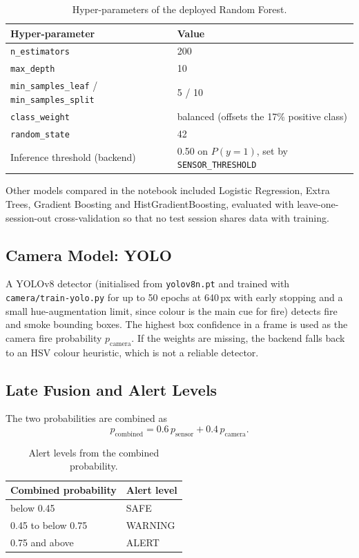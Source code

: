 \documentclass[12pt,a4paper]{article}
\begin{document}
\begin{table}[H]
\centering
\caption{Hyper-parameters of the deployed Random Forest.}
\label{tab:hyper}
\begin{tabular}{ll}
\toprule
\textbf{Hyper-parameter} & \textbf{Value} \\
\midrule
\texttt{n\_estimators}                         & 200 \\
\texttt{max\_depth}                            & 10 \\
\texttt{min\_samples\_leaf} / \texttt{min\_samples\_split} & 5 / 10 \\
\texttt{class\_weight}                         & balanced (offsets the 17\% positive class) \\
\texttt{random\_state}                         & 42 \\
Inference threshold (backend)                  & 0.50 on $P(y=1)$, set by \texttt{SENSOR\_THRESHOLD} \\
\bottomrule
\end{tabular}
\end{table}

Other models compared in the notebook included Logistic Regression, Extra Trees, Gradient Boosting and HistGradientBoosting, evaluated with leave-one-session-out cross-validation so that no test session shares data with training.

\subsection{Camera Model: YOLO}
A YOLOv8 detector (initialised from \texttt{yolov8n.pt} and trained with \texttt{camera/train-yolo.py} for up to 50 epochs at 640\,px with early stopping and a small hue-augmentation limit, since colour is the main cue for fire) detects fire and smoke bounding boxes. The highest box confidence in a frame is used as the camera fire probability $p_{\text{camera}}$. If the weights are missing, the backend falls back to an HSV colour heuristic, which is not a reliable detector.

\subsection{Late Fusion and Alert Levels}
The two probabilities are combined as
\begin{equation}
  p_{\text{combined}} = 0.6\,p_{\text{sensor}} + 0.4\,p_{\text{camera}}.
\end{equation}

\begin{table}[H]
\centering
\caption{Alert levels from the combined probability.}
\label{tab:alert}
\begin{tabular}{ll}
\toprule
\textbf{Combined probability} & \textbf{Alert level} \\
\midrule
below 0.45             & SAFE \\
0.45 to below 0.75     & WARNING \\
0.75 and above         & ALERT \\
\bottomrule
\end{tabular}
\end{table}
\end{document}
